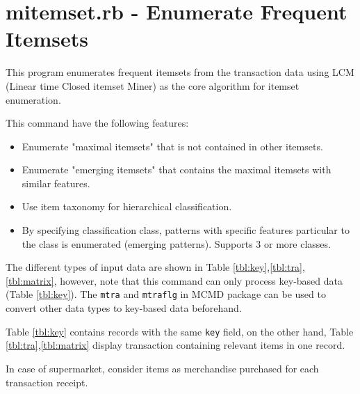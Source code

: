 
\section{mitemset.rb - Enumerate Frequent Itemsets \label{sect:mitemset}}

This program enumerates frequent itemsets from the transaction data using LCM (Linear time Closed itemset Miner) as the core algorithm for itemset enumeration\cite{Uno2004,UnoWeb}. 

This command have the following features: 
\begin{itemize}
 \item Enumerate "maximal itemsets" that is not contained in other itemsets. 
 \item Enumerate "emerging itemsets" that contains the maximal itemsets with similar features.
 \item Use item taxonomy for hierarchical classification. 
 \item By specifying classification class, patterns with specific features particular to the class is enumerated (emerging patterns).
Supports 3 or more classes. 
\end{itemize}


The different types of input data are shown in Table \ref{tbl:key},\ref{tbl:tra},\ref{tbl:matrix}, 
however, note that this command can only process key-based data (Table \ref{tbl:key}).
The \verb|mtra| and \verb|mtraflg| in MCMD package can be used to convert other data types to key-based data beforehand. 


Table \ref{tbl:key} contains records with the same \verb|key| field, on the other hand, Table \ref{tbl:tra},\ref{tbl:matrix} display transaction containing relevant items in one record. 

In case of supermarket, consider  items as merchandise purchased for each transaction receipt. 



